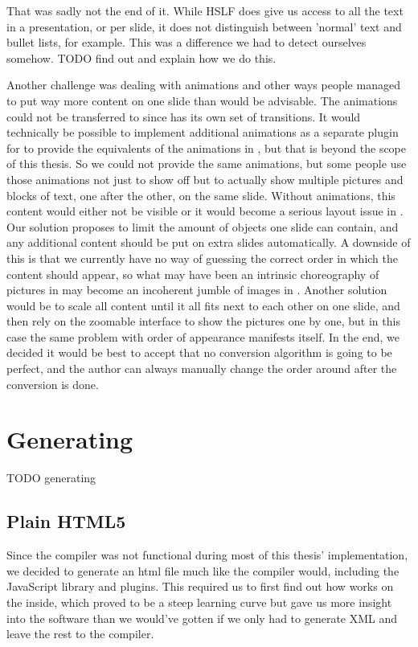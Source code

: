    That was sadly not the end of it. While HSLF does give us access to all the
   text in a presentation, or per slide, it does not distinguish between
   'normal' text and bullet lists, for example. This was a difference we had to
   detect ourselves somehow. TODO find out and explain how we do this.

   Another challenge was dealing with animations and other ways people managed
   to put way more content on one slide than would be advisable. The animations
   could not be transferred to \mxp since \mxp has its own set of transitions.
   It would technically be possible to implement additional animations as a
   separate plugin for \mxp to provide the equivalents of the animations in
   \ppt, but that is beyond the scope of this thesis. So we could not provide
   the same animations, but some people use those animations not just to show
   off but to actually show multiple pictures and blocks of text, one after the
   other, on the same slide. Without animations, this content would either not
   be visible or it would become a serious layout issue in \mxp. Our solution
   proposes to limit the amount of objects one slide can contain, and any
   additional content should be put on extra slides automatically. A downside
   of this is that we currently have no way of guessing the correct order in
   which the content should appear, so what may have been an intrinsic
   choreography of pictures in \ppt may become an incoherent jumble of images
   in \mxp. Another solution would be to scale all content until it all fits
   next to each other on one slide, and then rely on the zoomable interface to
   show the pictures one by one, but in this case the same problem with order
   of appearance manifests itself. In the end, we decided it would be best to
   accept that no conversion algorithm is going to be perfect, and the author
   can always manually change the order around after the conversion is done.

  \section{Generating \mxp}

   TODO generating

   \subsection{Plain HTML5}

    Since the \mxp compiler was not functional during most of this thesis'
    implementation, we decided to generate an html file much like the \mxp
    compiler would, including the \mxp JavaScript library and plugins. This
    required us to first find out how \mxp works on the inside, which proved to
    be a steep learning curve but gave us more insight into the software than
    we would've gotten if we only had to generate \mxp XML and leave the rest
    to the compiler.

